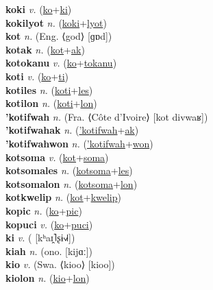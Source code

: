\textbf{koki} \textit{v.} (\hyperref[ko]{ko}+\hyperref[ki]{ki})
 \label{koki} \\
\textbf{kokilyot} \textit{n.} (\hyperref[koki]{koki}+\hyperref[lyot]{lyot})
 \label{kokilyot} \\
\textbf{kot} \textit{n.} (Eng. ⟨god⟩ [ɡɒd])
 \label{kot} \\
\textbf{kotak} \textit{n.} (\hyperref[kot]{kot}+\hyperref[ak]{ak})
 \label{kotak} \\
\textbf{kotokanu} \textit{v.} (\hyperref[ko]{ko}+\hyperref[tokanu]{tokanu})
 \label{kotokanu} \\
\textbf{koti} \textit{v.} (\hyperref[ko]{ko}+\hyperref[ti]{ti})
 \label{koti} \\
\textbf{kotiles} \textit{n.} (\hyperref[koti]{koti}+\hyperref[les]{les})
 \label{kotiles} \\
\textbf{kotilon} \textit{n.} (\hyperref[koti]{koti}+\hyperref[lon]{lon})
 \label{kotilon} \\
\textbf{'kotifwah} \textit{n.} (Fra. ⟨Côte d’Ivoire⟩ [kot divwaʁ])
 \label{'kotifwah} \\
\textbf{'kotifwahak} \textit{n.} (\hyperref['kotifwah]{'kotifwah}+\hyperref[ak]{ak})
 \label{'kotifwahak} \\
\textbf{'kotifwahwon} \textit{n.} (\hyperref['kotifwah]{'kotifwah}+\hyperref[won]{won})
 \label{'kotifwahwon} \\
\textbf{kotsoma} \textit{v.} (\hyperref[kot]{kot}+\hyperref[soma]{soma})
 \label{kotsoma} \\
\textbf{kotsomales} \textit{n.} (\hyperref[kotsoma]{kotsoma}+\hyperref[les]{les})
 \label{kotsomales} \\
\textbf{kotsomalon} \textit{n.} (\hyperref[kotsoma]{kotsoma}+\hyperref[lon]{lon})
 \label{kotsomalon} \\
\textbf{kotkwelip} \textit{n.} (\hyperref[kot]{kot}+\hyperref[kwelip]{kwelip})
 \label{kotkwelip} \\
\textbf{kopic} \textit{n.} (\hyperref[ko]{ko}+\hyperref[pic]{pic})
 \label{kopic} \\
\textbf{kopuci} \textit{v.} (\hyperref[ko]{ko}+\hyperref[puci]{puci})
 \label{kopuci} \\
\textbf{ki} \textit{v.} ( [kʰaɪ̯˥ʂɨ˧˩˧])
 \label{ki} \\
\textbf{kiah} \textit{n.} (ono. [kijɑː])
 \label{kiah} \\
\textbf{kio} \textit{v.} (Swa. ⟨kioo⟩ [kioo])
 \label{kio} \\
\textbf{kiolon} \textit{n.} (\hyperref[kio]{kio}+\hyperref[lon]{lon})
